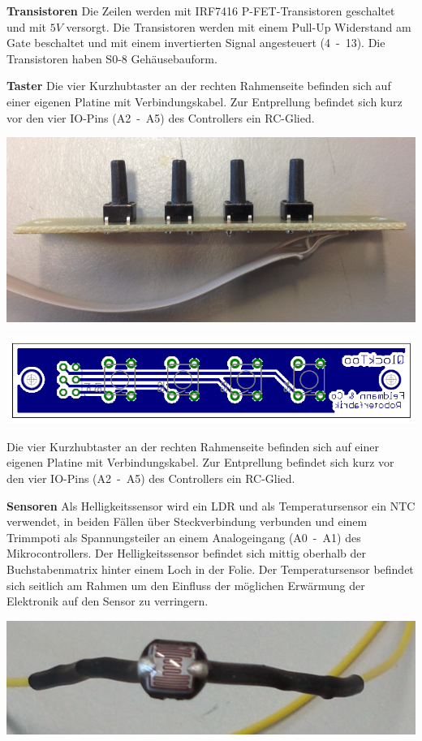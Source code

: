 \begin{multicols}{2}
\textbf{Transistoren} Die Zeilen werden mit IRF7416 P-FET-Transistoren geschaltet und mit $5V$ versorgt. Die Transistoren werden mit einem Pull-Up Widerstand am Gate beschaltet und mit einem invertierten Signal angesteuert (4~-~13). Die Transistoren haben S0-8 Gehäusebauform. 

\textbf{Taster} Die vier Kurzhubtaster an der rechten Rahmenseite befinden sich auf einer eigenen Platine mit Verbindungskabel. Zur Entprellung befindet sich kurz vor den vier IO-Pins (A2~-~A5) des Controllers ein RC-Glied. 

{
\centering 
\includegraphics[width=0.9\columnwidth]{Abbildungen/Konstruktion/Taster02} 

}

{
\centering 
\includegraphics[width=0.8\columnwidth]{Abbildungen/Elektronik/Taster01} 

}

Die vier Kurzhubtaster an der rechten Rahmenseite befinden sich auf einer eigenen Platine mit Verbindungskabel. Zur Entprellung befindet sich kurz vor den vier IO-Pins (A2~-~A5) des Controllers ein RC-Glied. 

\textbf{Sensoren} Als Helligkeitssensor wird ein LDR und als Temperatursensor ein NTC verwendet, in beiden Fällen über Steckverbindung verbunden und einem Trimmpoti als Spannungsteiler an einem Analogeingang (A0~-~A1) des Mikrocontrollers. Der Helligkeitssensor befindet sich mittig oberhalb der Buchstabenmatrix hinter einem Loch in der Folie. Der Temperatursensor befindet sich seitlich am Rahmen um den Einfluss der möglichen Erwärmung der Elektronik auf den Sensor zu verringern. \newline

{
\centering 
\includegraphics[width=0.9\columnwidth]{Abbildungen/Elektronik/LDR} 

}
\end{multicols}

